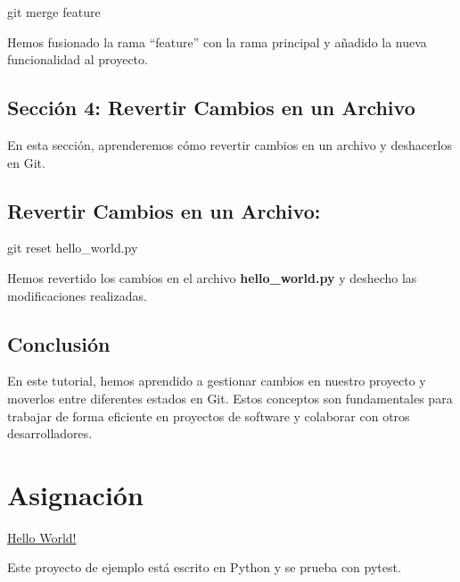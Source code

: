 \documentclass[
  a4paper,
  DIV=11,
  numbers=noendperiod,
  onepage,
  openany]{scrreprt}
\newenvironment{Shaded}{\begin{snugshade}}{\end{snugshade}}
\newcommand{\FunctionTok}[1]{\textcolor[rgb]{0.28,0.35,0.67}{#1}}
\newcommand{\NormalTok}[1]{\textcolor[rgb]{0.00,0.23,0.31}{#1}}
\begin{document}
\begin{Shaded}
\begin{Highlighting}[]
\FunctionTok{git}\NormalTok{ merge feature}
\end{Highlighting}
\end{Shaded}

Hemos fusionado la rama ``feature'' con la rama principal y añadido la
nueva funcionalidad al proyecto.

\section{Sección 4: Revertir Cambios en un
Archivo}\label{secciuxf3n-4-revertir-cambios-en-un-archivo}

En esta sección, aprenderemos cómo revertir cambios en un archivo y
deshacerlos en Git.

\section{Revertir Cambios en un
Archivo:}\label{revertir-cambios-en-un-archivo}

\begin{Shaded}
\begin{Highlighting}[]
\FunctionTok{git}\NormalTok{ reset hello\_world.py}
\end{Highlighting}
\end{Shaded}

Hemos revertido los cambios en el archivo \textbf{hello\_world.py} y
deshecho las modificaciones realizadas.

\section{Conclusión}\label{conclusiuxf3n}

En este tutorial, hemos aprendido a gestionar cambios en nuestro
proyecto y moverlos entre diferentes estados en Git. Estos conceptos son
fundamentales para trabajar de forma eficiente en proyectos de software
y colaborar con otros desarrolladores.

\chapter{Asignación}\label{asignaciuxf3n}

\href{https://classroom.github.com/a/o-qydr2W}{Hello World!}

Este proyecto de ejemplo está escrito en Python y se prueba con pytest.
\end{document}
